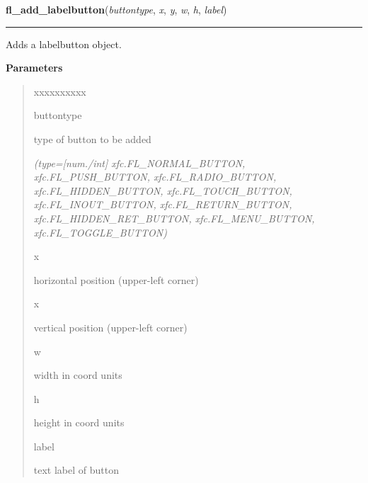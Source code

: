     \label{xformslib:library:fl_add_labelbutton}

    \vspace{0.5ex}

\hspace{.8\funcindent}\begin{boxedminipage}{\funcwidth}

    \raggedright \textbf{fl\_add\_labelbutton}(\textit{buttontype}, \textit{x}, \textit{y}, \textit{w}, \textit{h}, \textit{label})

    \vspace{-1.5ex}

    \rule{\textwidth}{0.5\fboxrule}
\setlength{\parskip}{2ex}
    Adds a labelbutton object.

\setlength{\parskip}{1ex}
      \textbf{Parameters}
      \vspace{-1ex}

      \begin{quote}
        \begin{Ventry}{xxxxxxxxxx}

          \item[buttontype]

          type of button to be added

            {\it (type=[num./int] xfc.FL\_NORMAL\_BUTTON, xfc.FL\_PUSH\_BUTTON, 
xfc.FL\_RADIO\_BUTTON, xfc.FL\_HIDDEN\_BUTTON, xfc.FL\_TOUCH\_BUTTON, 
xfc.FL\_INOUT\_BUTTON, xfc.FL\_RETURN\_BUTTON, xfc.FL\_HIDDEN\_RET\_BUTTON,
xfc.FL\_MENU\_BUTTON, xfc.FL\_TOGGLE\_BUTTON)}

          \item[x]

          horizontal position (upper-left corner)

          \item[x]

          vertical position (upper-left corner)

          \item[w]

          width in coord units

          \item[h]

          height in coord units

          \item[label]

          text label of button


\end{Ventry}
\end{quote}
\end{boxedminipage}

